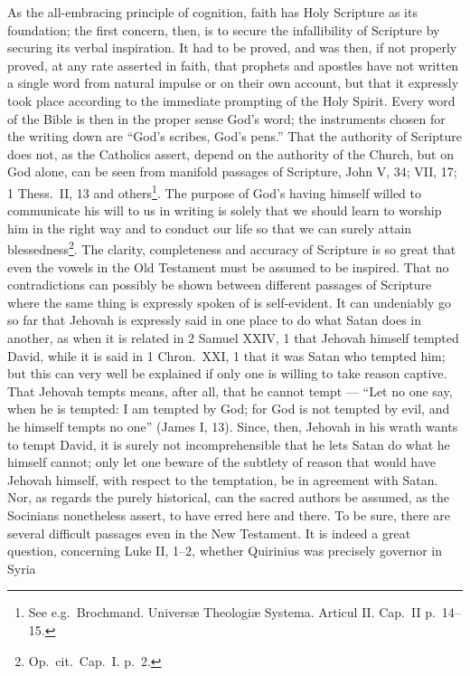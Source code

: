 \documentclass[12pt,a4paper]{article}
\newcommand{\opage}[1]{\marginnote{\footnotesize\textit{[#1]}}}
\begin{document}
As the all-embracing principle of cognition, faith has Holy Scripture
as its foundation; the first concern, then, is to secure the
infallibility of Scripture by securing its verbal inspiration. It had to be
proved, and was then, if not properly proved, at any rate asserted in faith,
that prophets and apostles have not written a single word from natural impulse
or on their own account, but that it expressly took place according to
the immediate prompting of the Holy Spirit. Every word of the Bible
is then in the proper sense God's word; the instruments chosen for the
writing down are ``God's scribes, God's pens.'' That the authority of
Scripture does not, as the Catholics assert, depend on the authority
of the Church, but on God alone, can be seen from manifold passages of Scripture, John
V, 34; VII, 17; 1 Thess.\ II, 13 and others\footnote{See e.g.\ Brochmand.
Universæ Theologiæ Systema. Articul II. Cap.\ II p.\ 14--15.}. %
The purpose of God's having himself willed
to communicate his will to us in writing is solely that we
should learn to worship him in the right way and to conduct our life
so that we can surely attain blessedness\footnote{Op.\ cit.\
Cap.\ I. p.\ 2.}. %
The clarity,
completeness and accuracy of Scripture is so great that even the vowels in
the Old Testament must be assumed to be inspired. That
\opage{19}no contradictions can possibly be shown between different passages of Scripture
where the same thing is expressly spoken of is self-evident. It
can undeniably go so far that Jehovah is expressly said in one place
to do what Satan does in another, as when it is related in 2
Samuel XXIV, 1 that Jehovah himself tempted David, while
it is said in 1 Chron.\ XXI, 1 that it was Satan who tempted
him; but this can very well be explained if only one is willing to take
reason captive. That Jehovah tempts means, after all, that he cannot
tempt --- ``Let no one say, when he is tempted: I am tempted by God; for
God is not tempted by evil, and he himself tempts no one'' (James
I, 13). Since, then, Jehovah in his wrath wants to tempt David, it is surely
not incomprehensible that he lets Satan do what he himself
cannot; only let one beware of the subtlety of reason that would have
Jehovah himself, with respect to the temptation, be in agreement with Satan.
Nor, as regards the purely historical, can the sacred
authors be assumed, as the Socinians nonetheless assert, to
have erred here and there. To be sure, there are several
difficult passages even in the New Testament. It is indeed a great question,
concerning Luke II, 1--2, whether Quirinius was precisely governor in Syria
\end{document}
